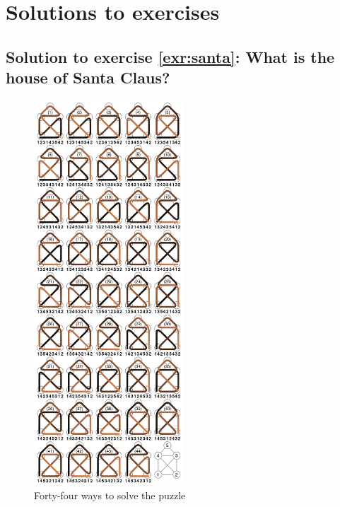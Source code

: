 \documentclass[
  12pt,
  oneside]{book}
\theoremstyle{definition}
\theoremstyle{definition}
\theoremstyle{definition}
\theoremstyle{definition}
\theoremstyle{remark}
\begin{document}
\hypertarget{solutions-to-exercises}{%
\section{Solutions to exercises}\label{solutions-to-exercises}}

\hypertarget{sol:santa}{%
\subsection*{Solution to exercise \ref{exr:santa}: What is the house of Santa Claus?}\label{sol:santa}}

\begin{figure}
\centering
\includegraphics[width=0.5\textwidth,height=\textheight]{fig/nikolaus2.png}
\caption[\label{fig:nikolaus2} Forty-four ways to solve the puzzle]{\label{fig:nikolaus2} Forty-four ways to solve the puzzle\footnotemark{}}
\end{figure}
\end{document}
